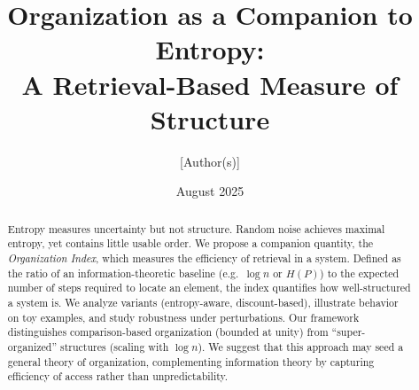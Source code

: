\documentclass[11pt]{article}
\title{Organization as a Companion to Entropy:\\
A Retrieval-Based Measure of Structure}
\author{[Author(s)]}
\date{August 2025}
\begin{document}
\maketitle
\begin{abstract}
Entropy measures uncertainty but not structure. Random noise achieves maximal entropy, yet contains little usable order. We propose a companion quantity, the \emph{Organization Index}, which measures the efficiency of retrieval in a system. Defined as the ratio of an information-theoretic baseline (e.g.\ $\log n$ or $H(P)$) to the expected number of steps required to locate an element, the index quantifies how well-structured a system is. We analyze variants (entropy-aware, discount-based), illustrate behavior on toy examples, and study robustness under perturbations. Our framework distinguishes comparison-based organization (bounded at unity) from ``super-organized'' structures (scaling with $\log n$). We suggest that this approach may seed a general theory of organization, complementing information theory by capturing efficiency of access rather than unpredictability.
\end{abstract}
\end{document}
